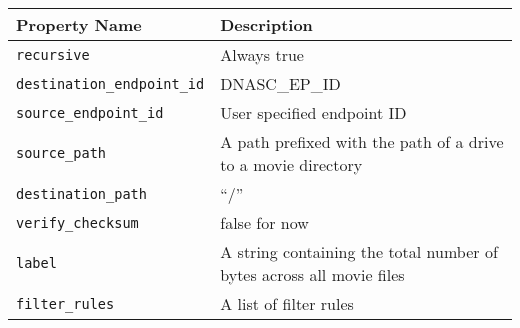 \begin{tabularx}{\textwidth}{l|X}
\hline
 Property Name           & Description                                                          \\
\hline
 \texttt{recursive}               & Always true                                                          \\
 \texttt{destination\_endpoint\_id} & DNASC\_EP\_ID                                                          \\
 \texttt{source\_endpoint\_id}      & User specified endpoint ID                                           \\
 \texttt{source\_path}             & A path prefixed with the path of a drive to a movie directory        \\
 \texttt{destination\_path}        & ``/''                                                                \\
 \texttt{verify\_checksum}         & false for now                                                        \\
 \texttt{label}                   & A string containing the total number of bytes across all movie files \\
 \texttt{filter\_rules}            & A list of filter rules                                               \\
\hline
\end{tabularx}